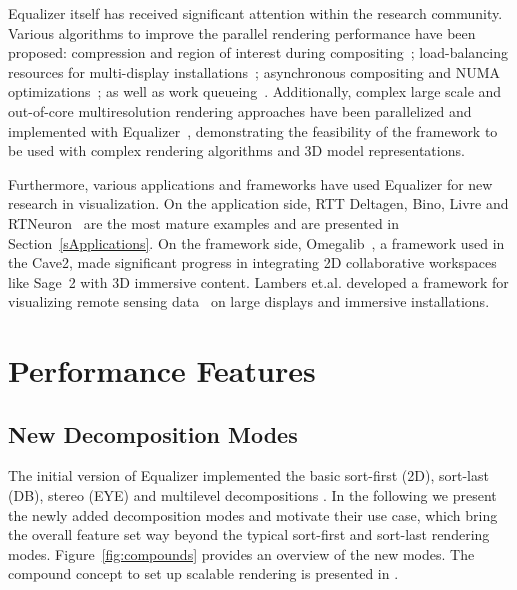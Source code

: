 \documentclass[10pt,journal,compsoc]{IEEEtran}
\newcommand{\sref}[1]{Section~\ref{#1}}
\newcommand{\fig}[1]{Figure~\ref{#1}}
\begin{document}
\textsf{Equalizer} itself has received significant attention within the research
community. Various algorithms to improve the parallel rendering performance have
been proposed: compression and region of interest during
compositing~\cite{MEP:10}; load-balancing resources for multi-display
installations~\cite{EEP:11}; asynchronous compositing and NUMA
optimizations~\cite{EBAHMP:12}; as well as work queueing~\cite{SPEP:16}.
Additionally, complex large scale and out-of-core multiresolution
rendering approaches have been parallelized and implemented with
Equalizer~\cite{GMBP:10, GEMPG:13}, demonstrating the feasibility of
the framework to be used with complex rendering algorithms and 3D model
representations.

Furthermore, various applications and frameworks have used \textsf{Equalizer}
for new research in visualization. On the application side, \textsf{RTT
Deltagen}, \textsf{Bino}, \textsf{Livre} and \textsf{RTNeuron}~\cite{HBBES:13}
are the most mature examples and are presented in \sref{sApplications}. On the
framework side, \textsf{Omegalib}~\cite{Omegalib}, a framework used in the
Cave2, made significant progress in integrating 2D collaborative workspaces like
\textsf{Sage~2} with 3D immersive content. Lambers et.al. developed a framework
for visualizing remote sensing data~\cite{LK:09} on large displays and immersive
installations.

\section{Performance Features}


\subsection{New Decomposition Modes}

The initial version of \textsf{Equalizer} implemented the basic sort-first (2D),
sort-last (DB), stereo (EYE) and multilevel decompositions \cite{EMP:09}. In the
following we present the newly added decomposition modes and motivate their use
case, which bring the overall feature set way beyond the typical sort-first and
sort-last rendering modes. \fig{fig:compounds} provides an overview of the new
modes. The compound concept to set up scalable rendering is presented in
\cite{EMP:09}.
\end{document}
